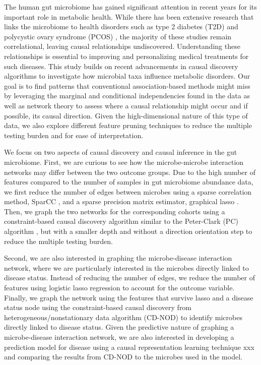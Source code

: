 \documentclass[12pt,letterpaper]{article}
\begin{document}
The human gut microbiome has gained significant attention in recent years for its important role in metabolic health. While there has been extensive research that links the microbiome to health disorders such as type 2 diabetes (T2D) \citep{zhou2019t2d} and polycystic ovary syndrome (PCOS) \citep{yang2024pcos}, the majority of these studies remain correlational, leaving causal relationships undiscovered. Understanding these relationships is essential to improving and personalizing medical treatments for such diseases.
This study builds on recent advancements in causal discovery algorithms to investigate how microbial taxa influence metabolic disorders. Our goal is to find patterns that conventional association-based methods might miss by leveraging the marginal and conditional independencies found in the data as well as network theory to assess where a causal relationship might occur and if possible, its causal direction. Given the high-dimensional nature of this type of data, we also explore different feature pruning techniques to reduce the multiple testing burden and for ease of interpretation. 

We focus on two aspects of causal discovery and causal inference in the gut microbiome. First, we are curious to see how the microbe-microbe interaction networks may differ between the two outcome groups. Due to the high number of features compared to the number of samples in gut microbiome abundance data, we first reduce the number of edges between microbes using a sparse correlation method, SparCC \citep{weiss2016correlationbenchmark, friedman2012sparcc}, and a sparse precision matrix estimator, graphical lasso \citep{friedman2007glasso}. Then, we graph the two networks for the corresponding cohorts using a constraint-based causal discovery algorithm similar to the Peter-Clark (PC) algorithm \citep{glymour2019review}, but with a smaller depth and without a direction orientation step to reduce the multiple testing burden.

Second, we are also interested in graphing the microbe-disease interaction network, where we are particularly interested in the microbes directly linked to disease status. Instead of reducing the number of edges, we reduce the number of features using logistic lasso regression to account for the outcome variable. Finally, we graph the network using the features that survive lasso and a disease status node using the constraint-based causal discovery from heterogeneous/nonstationary data algorithm (CD-NOD) \citep{huang2019cdnod} to identify microbes directly linked to disease status. Given the predictive nature of graphing a microbe-disease interaction network, we are also interested in developing a prediction model for disease using a causal representation learning technique xxx and comparing the results from CD-NOD to the microbes used in the model.
\end{document}
